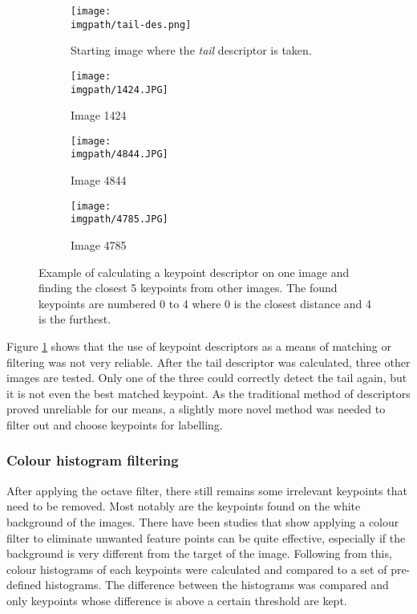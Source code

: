 \begin{figure}[H]
\centering
	\begin{subfigure}{0.45\textwidth}
	\texttt{[image: \\imgpath/tail-des.png]}
	\caption{Starting image where the \textit{tail} descriptor is taken.}
	\end{subfigure}
\hspace*{\fill}
	\begin{subfigure}{0.45\textwidth}
	\texttt{[image: \\imgpath/1424.JPG]}
	\caption{Image 1424}
	\end{subfigure}

\vspace{0.5cm}

	\begin{subfigure}{0.45\textwidth}
	\texttt{[image: \\imgpath/4844.JPG]}
	\caption{Image 4844}
	\end{subfigure}
\hspace*{\fill}
	\begin{subfigure}{0.45\textwidth}
	\texttt{[image: \\imgpath/4785.JPG]}
	\caption{Image 4785}
	\end{subfigure}

\caption{Example of calculating a keypoint descriptor on one image and finding the closest 5 keypoints from other images. The found keypoints are numbered 0 to 4 where 0 is the closest distance and 4 is the furthest.}
\label{fig:kpdescriptor}
\end{figure}
\noindent
Figure \ref{fig:kpdescriptor} shows that the use of keypoint descriptors as a means of matching or filtering was not very reliable. After the tail descriptor was calculated, three other images are tested. Only one of the three could correctly detect the tail again, but it is not even the best matched keypoint. As the traditional method of descriptors proved unreliable for our means, a slightly more novel method was needed to filter out and choose keypoints for labelling.



\subsubsection{Colour histogram filtering}
After applying the octave filter, there still remains some irrelevant keypoints that need to be removed. Most notably are the keypoints found on the white background of the images. There have been studies \cite{color-histogram, color-filter} that show applying a colour filter to eliminate unwanted feature points can be quite effective, especially if the background is very different from the target of the image. Following from this, colour histograms of each keypoints were calculated and compared to a set of pre-defined histograms. The difference between the histograms was compared and only keypoints whose difference is above a certain threshold are kept. 

